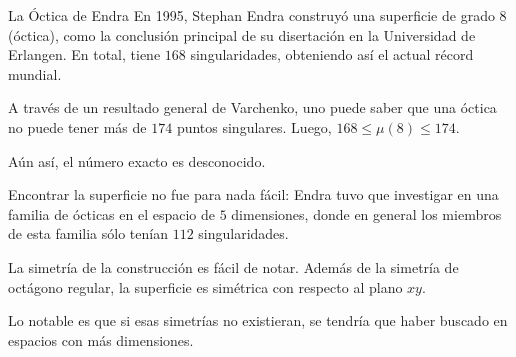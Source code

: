 \begin{surferPage}{La Óctica de Endra}
    En 1995, Stephan Endra construyó una superficie de grado $8$ (óctica),
    como la conclusión principal de su disertación en la Universidad de Erlangen.
    En total, tiene $168$ singularidades, obteniendo así el actual récord mundial.
    
    A través de un resultado general de Varchenko, uno puede saber que una óctica
    no puede tener más de $174$ puntos singulares. Luego, $168 \le \mu(8) \le 174$. 
    
    Aún así, el número exacto es desconocido.

    Encontrar la superficie no fue para nada fácil: Endra tuvo que investigar en una
    familia de ócticas en el espacio de $5$ dimensiones, donde en general los
    miembros de esta familia sólo tenían $112$ singularidades.

    La simetría de la construcción es fácil de notar. Además de la simetría de
    octágono regular, la superficie es simétrica con respecto al plano $xy$.

    Lo notable es que si esas simetrías no existieran, se tendría que haber buscado en
    espacios con más dimensiones.
\end{surferPage}
